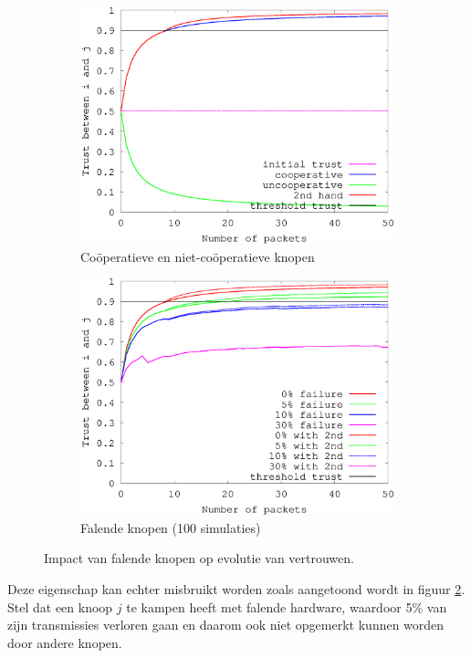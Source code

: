 \begin{figure}[ht]
\centering
\begin{subfigure}{.49\textwidth}
  \centering
  \includegraphics[width=.9\linewidth]{./resources/reputation-paper.eps}
  \caption{Co\"operatieve en niet-co\"operatieve knopen}
  \label{fig:reputation-paper}
\end{subfigure}
\begin{subfigure}{.49\textwidth}
  \centering
  \includegraphics[width=.9\linewidth]{./resources/reputation-with-failure.eps}
  \caption{Falende knopen (100 simulaties)}
  \label{fig:reputation-with-failure}
\end{subfigure}
\caption{Impact van falende knopen op evolutie van vertrouwen.}
\label{fig:reputation-paper-with-failure}
\end{figure}

Deze eigenschap kan echter misbruikt worden zoals aangetoond wordt in figuur
\ref{fig:reputation-with-failure}. Stel dat een knoop $j$ te kampen heeft met
falende hardware, waardoor 5\% van zijn transmissies verloren gaan en daarom
ook niet opgemerkt kunnen worden door andere knopen.

